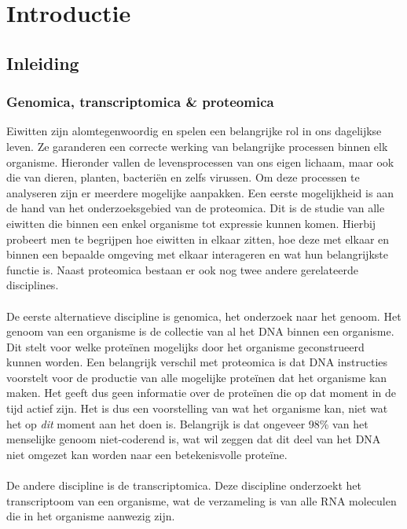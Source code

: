 \chapter{Introductie}\label{ch:introductie}


\section{Inleiding}\label{sec:inleiding}

\subsection{Genomica, transcriptomica \& proteomica}\label{subsec:genomica-transcriptomica-&-proteomica}
Eiwitten zijn alomtegenwoordig en spelen een belangrijke rol in ons dagelijkse leven.
Ze garanderen een correcte werking van belangrijke processen binnen elk organisme.
Hieronder vallen de levensprocessen van ons eigen lichaam, maar ook die van dieren, planten, bacteriën en zelfs virussen.
Om deze processen te analyseren zijn er meerdere mogelijke aanpakken.
Een eerste mogelijkheid is aan de hand van het onderzoeksgebied van de proteomica.
Dit is de studie van alle eiwitten die binnen een enkel organisme tot expressie kunnen komen.
Hierbij probeert men te begrijpen hoe eiwitten in elkaar zitten, hoe deze met elkaar en binnen een bepaalde omgeving met elkaar interageren en wat hun belangrijkste functie is.
Naast proteomica bestaan er ook nog twee andere gerelateerde disciplines.
\\ \\
De eerste alternatieve discipline is genomica, het onderzoek naar het genoom.
Het genoom van een organisme is de collectie van al het DNA binnen een organisme.
Dit stelt voor welke proteïnen mogelijks door het organisme geconstrueerd kunnen worden.
Een belangrijk verschil met proteomica is dat DNA instructies voorstelt voor de productie van alle mogelijke proteïnen dat het organisme kan maken.
Het geeft dus geen informatie over de proteïnen die op dat moment in de tijd actief zijn.
Het is dus een voorstelling van wat het organisme kan, niet wat het op \textit{dit} moment aan het doen is.
Belangrijk is dat ongeveer 98\% van het menselijke genoom niet-coderend is, wat wil zeggen dat dit deel van het DNA niet omgezet kan worden naar een betekenisvolle proteïne.
\\ \\
De andere discipline is de transcriptomica.
Deze discipline onderzoekt het transcriptoom van een organisme, wat de verzameling is van alle RNA moleculen die in het organisme aanwezig zijn.
